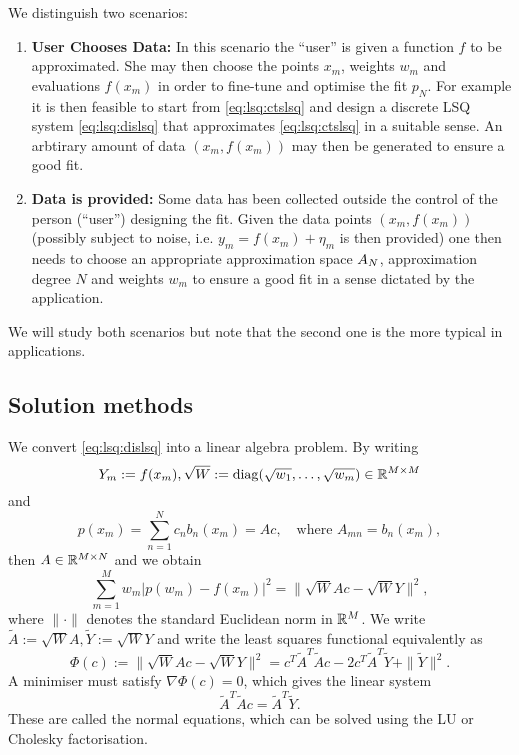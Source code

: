 We distinguish two scenarios:
\begin{enumerate}
\item {\bf User Chooses Data: } In this scenario the ``user'' is given a
function $f$ to be approximated. She may then choose the points $x_m$, weights
$w_m$ and evaluations $f(x_m)$ in order to fine-tune and optimise the fit $p_N$.
For example it is then feasible to start from \eqref{eq:lsq:ctslsq} and design a
discrete LSQ system \eqref{eq:lsq:dislsq} that approximates
\eqref{eq:lsq:ctslsq} in a suitable sense. An arbtirary amount of data $(x_m,
f(x_m))$ may then be generated to ensure a good fit.

\item {\bf Data is provided: } Some data has been collected outside the control 
of the person (``user'') designing the fit. Given the data points $(x_m, f(x_m))$ 
(possibly subject to noise, i.e. $y_m = f(x_m) + \eta_m$ is then provided)
one then needs to choose an appropriate approximation space $\AA_N$, 
approximation degree $N$ and weights $w_m$ to ensure a good fit in a sense 
dictated by the application. 
\end{enumerate}

We will study both scenarios but note that the second one is the more 
typical in applications. 

\subsection{Solution methods}
%
\label{sec:lsq:soln}
%
We convert \eqref{eq:lsq:dislsq} into a linear algebra problem. 
By writing 
\[
    Y_m := f(x_m),  \sqrt{W} := {\rm diag}(\sqrt{w_1}, \dots, \sqrt{w_m}) \in \R^{M \times M}
\]
and 
\[
    p(x_m) = \sum_{n = 1}^N c_n b_n(x_m) = A c, 
    \quad \text{where }  A_{mn} = b_n(x_m),
\]
then $A \in \R^{M \times N}$ and we obtain 
\[
    \sum_{m = 1}^M w_m | p(w_m) - f(x_m)|^2 
    = \big\| \sqrt{W} A c - \sqrt{W} Y \big\|^2,
\]
where $\|\cdot\|$ denotes the standard Euclidean norm in $\R^M$. 
We write $\tilde{A} := \sqrt{W} A, \tilde{Y} := \sqrt{W} Y$ and 
write the least squares functional equivalently as 
\[
    \Phi(c) := \big\| \sqrt{W} A c - \sqrt{W} Y \big\|^2 
    = c^T \tilde{A}^T \tilde{A} c - 2 c^T \tilde{A}^T \tilde{Y} + \|\tilde{Y}\|^2.
\]
A minimiser must satisfy $\nabla\Phi(c) = 0$, which gives the linear system 
\begin{equation} \label{eq:lsq:normaleqns}
    \tilde{A}^T\tilde{A} c = \tilde{A}^T \tilde{Y}.
\end{equation}
These are called the normal equations, which can be solved using 
the LU or Cholesky factorisation. 

